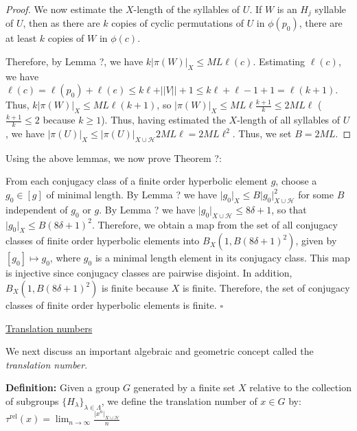 \documentclass[12pt]{article}
\newcommand{\vs}{\vskip10pt}
\begin{document}
\begin{proof}
		\vs 
		
		We now estimate the $X$-length of the syllables of $U$. If $W$ is an $H_j$ syllable of $U$, then as there are $k$ copies of cyclic permutations of $U$ in $\phi(p_0)$, there are at least $k$ copies of $W$ in $\phi(c)$. 
		
		\vs 
		
		Therefore, by Lemma ?, we have $k \vert \pi(W) \vert_X \leq ML \ell (c)$. Estimating $\ell(c)$, we have $\ell(c) = \ell(p_0) + \ell(e) \leq k \ell + \vert \vert V \vert \vert + 1 \leq k \ell + \ell - 1 + 1 = \ell (k+1)$. Thus, $k \vert \pi(W) \vert_X \leq ML \ell (k+1)$, so $\vert \pi(W) \vert_X \leq ML \ell \frac{k + 1}{k} \leq 2ML \ell$ ($\frac{k+1}{k} \leq 2$ because $k \geq 1$). Thus, having estimated the $X$-length of all syllables of $U$, we have $\vert \pi(U) \vert_X \leq \vert \pi(U) \vert_{X \cup \mathcal{H}} 2ML \ell = 2 ML \ell^2$. Thus, we set $B = 2ML$.
		
	\end{proof}

	Using the above lemmas, we now prove Theorem ?: 
	
	\vs 
	
	From each conjugacy class of a finite order hyperbolic element $g$, choose a $g_0 \in [g]$ of minimal length. By Lemma ? we have $\vert g_0 \vert_X \leq B \vert g_0 \vert_{X \cup \mathcal{H}}^2$ for some $B$ independent of $g_0$ or $g$. By Lemma ? we have $\vert g_0 \vert_{X \cup \mathcal{H}} \leq 8 \delta + 1$, so that $\vert g_0 \vert_X \leq B(8 \delta + 1)^2$. Therefore, we obtain a map from the set of all conjugacy classes of finite order hyperbolic elements into $B_X(1, B(8 \delta + 1)^2)$, given by $[g_0] \mapsto g_0$, where $g_0$ is a minimal length element in its conjugacy class. This map is injective since conjugacy classes are pairwise disjoint. In addition, $B_X(1, B(8 \delta + 1)^2)$ is finite because $X$ is finite. Therefore, the set of conjugacy classes of finite order hyperbolic elements is finite. $\square$
	
	\vs 
	
	\underline{Translation numbers}
	
	\vs 
	
	We next discuss an important algebraic and geometric concept called the \textit{translation number}. 
	
	\vs 
	
	\textbf{Definition: } Given a group $G$ generated by a finite set $X$ relative to the collection of subgroups $\{H_{\lambda}\}_{\lambda \in \Lambda}$, we define the translation number of $x \in G$ by: $\tau^{\text{rel}}(x) = \lim_{n \rightarrow \infty} \frac{\vert x^n \vert_{X \cup \mathcal{H}}}{n}$
	
\end{document}
